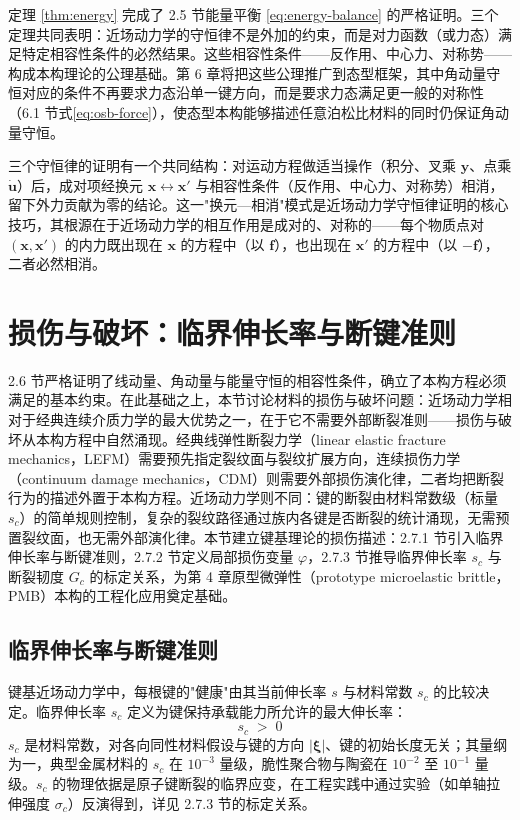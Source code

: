 定理 \ref{thm:energy} 完成了 2.5 节能量平衡 \eqref{eq:energy-balance} 的严格证明。三个定理共同表明：近场动力学的守恒律不是外加的约束，而是对力函数（或力态）满足特定相容性条件的必然结果。这些相容性条件——反作用、中心力、对称势——构成本构理论的公理基础。第 6 章将把这些公理推广到态型框架，其中角动量守恒对应的条件不再要求力态沿单一键方向，而是要求力态满足更一般的对称性（6.1 节式\eqref{eq:osb-force}），使态型本构能够描述任意泊松比材料的同时仍保证角动量守恒。

\begin{remark}
  三个守恒律的证明有一个共同结构：对运动方程做适当操作（积分、叉乘 $\mathbf{y}$、点乘 $\dot{\mathbf{u}}$）后，成对项经换元 $\mathbf{x}\leftrightarrow\mathbf{x}'$ 与相容性条件（反作用、中心力、对称势）相消，留下外力贡献为零的结论。这一"换元—相消"模式是近场动力学守恒律证明的核心技巧，其根源在于近场动力学的相互作用是成对的、对称的——每个物质点对 $(\mathbf{x},\mathbf{x}')$ 的内力既出现在 $\mathbf{x}$ 的方程中（以 $\mathbf{f}$），也出现在 $\mathbf{x}'$ 的方程中（以 $-\mathbf{f}$），二者必然相消。
\end{remark}

\section{损伤与破坏：临界伸长率与断键准则}

2.6 节严格证明了线动量、角动量与能量守恒的相容性条件，确立了本构方程必须满足的基本约束。在此基础之上，本节讨论材料的损伤与破坏问题：近场动力学相对于经典连续介质力学的最大优势之一，在于它不需要外部断裂准则——损伤与破坏从本构方程中自然涌现。经典线弹性断裂力学（linear elastic fracture mechanics，LEFM）需要预先指定裂纹面与裂纹扩展方向，连续损伤力学（continuum damage mechanics，CDM）则需要外部损伤演化律，二者均把断裂行为的描述外置于本构方程。近场动力学则不同：键的断裂由材料常数级（标量 $s_c$）的简单规则控制，复杂的裂纹路径通过族内各键是否断裂的统计涌现，无需预置裂纹面，也无需外部演化律。本节建立键基理论的损伤描述：2.7.1 节引入临界伸长率与断键准则，2.7.2 节定义局部损伤变量 $\varphi$，2.7.3 节推导临界伸长率 $s_c$ 与断裂韧度 $G_c$ 的标定关系，为第 4 章原型微弹性（prototype microelastic brittle，PMB）本构的工程化应用奠定基础。

\subsection{临界伸长率与断键准则}

键基近场动力学中，每根键的"健康"由其当前伸长率 $s$ 与材料常数 $s_c$ 的比较决定。临界伸长率 $s_c$ 定义为键保持承载能力所允许的最大伸长率：
\begin{equation}
  \label{eq:critical-stretch}
  s_c \;>\; 0
\end{equation}
$s_c$ 是材料常数，对各向同性材料假设与键的方向 $|\boldsymbol{\xi}|$、键的初始长度无关；其量纲为一，典型金属材料的 $s_c$ 在 $10^{-3}$ 量级，脆性聚合物与陶瓷在 $10^{-2}$ 至 $10^{-1}$ 量级。$s_c$ 的物理依据是原子键断裂的临界应变，在工程实践中通过实验（如单轴拉伸强度 $\sigma_c$）反演得到，详见 2.7.3 节的标定关系。

